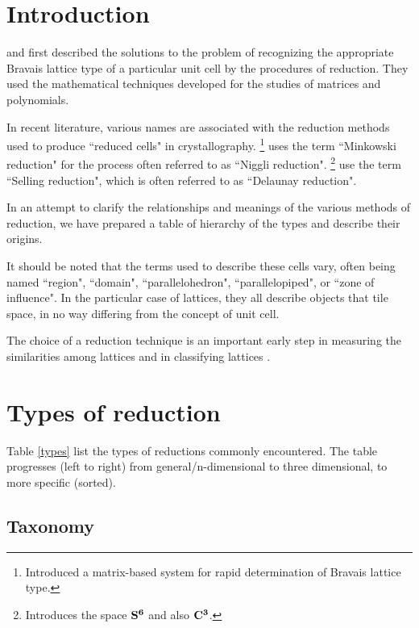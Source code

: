\documentclass[preprint]{iucr}              %
\numberwithin{equation}{section}
\begin{document}
	
	\section{Introduction}
	
	 and  
	first described the solutions
	to the problem of recognizing the appropriate Bravais 
	lattice type of a particular unit cell by the procedures 
	of reduction. They used the mathematical techniques 
	developed for the studies of matrices and polynomials.
	
	In recent literature, various names are associated with 
	the reduction methods used to produce ``reduced cells"
	in crystallography. \footnote{Introduced a matrix-based system for rapid determination of Bravais
	lattice type.} uses 
	the term ``Minkowski reduction" for the process often referred to as ``Niggli reduction". \footnote{Introduces the space $\bf{S^6}$ and also $\bf{C^3}$.} use the term 
	``Selling reduction", which is often 
	referred to as ``Delaunay reduction".
	
	In an attempt to clarify the relationships and meanings of the various 
	methods of reduction, we have prepared a table of hierarchy of the types
	and describe their origins.
	
	It should be noted that the terms used to describe these cells vary,
	often being named ``region", ``domain", ``parallelohedron", ``parallelopiped", or ``zone of influence". In the particular 
	case of lattices, they all describe objects that tile space, in no way
	differing from the concept of unit cell.

    The choice of a reduction technique is an important early step in measuring the similarities among lattices and in
    classifying lattices \cite{andrews2023measuring} 
    \cite{andrews2023approximating}.
	
	\section{Types of reduction}
	
	Table \ref{types} list the types of reductions commonly encountered. The table
	progresses (left to right) from general/n-dimensional to three dimensional, to
	more specific (sorted).
	
	\subsection{Taxonomy}
	
\end{document}
